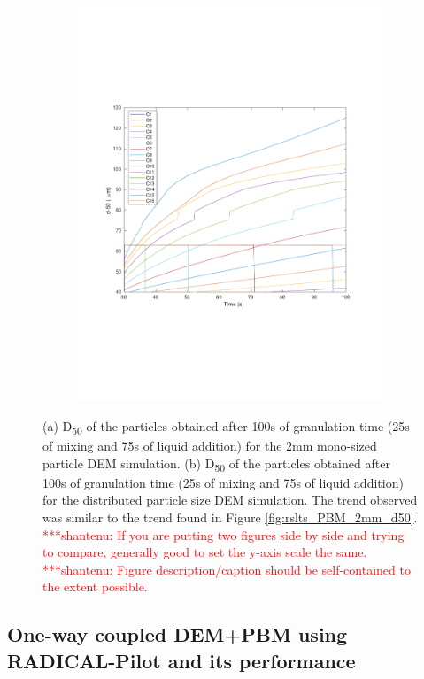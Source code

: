 \documentclass[preprint,11pt,authoryear]{elsarticle}
\newcommand{\jhanote}[1]{ {\textcolor{red} { ***shantenu: #1 }}}
\newcommand{\jhanote}[1]{ {\textcolor{red} { ***shantenu: #1 }}}
\begin{document}
\begin{figure}
\begin{subfigure}{.45\textwidth}
\includegraphics[scale=0.5]{rslts_pbm_d50_128_555.pdf}
\caption{}
\label{fig:rslts_PBM_psd_d50}
\end{subfigure}
\caption{(a) D\textsubscript{50} of the particles obtained after 100s of granulation time (25s of 
mixing and 75s of liquid addition) for the 2mm mono-sized particle DEM simulation. (b) D\textsubscript{50} of the particles obtained after 100s of granulation time (25s of mixing and 75s of liquid addition) for the distributed particle size DEM simulation. The trend observed was similar to the trend 
found in Figure \ref{fig:rslts_PBM_2mm_d50}. \jhanote{If you are putting two figures side by side and trying to compare, generally good to set the y-axis scale the same.} \jhanote{Figure description/caption should be self-contained to the extent possible.}}
\end{figure}  


\subsection{One-way coupled DEM+PBM using RADICAL-Pilot and its performance} 
\end{document}
